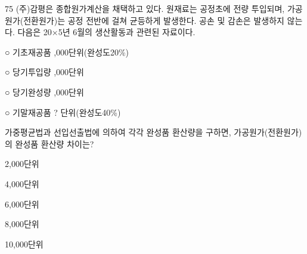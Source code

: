 \begin{question}{75}
(주)감평은 종합원가계산을 채택하고 있다. 원재료는 공정초에 전량 투입되며, 가공원가(전환원가)는 공정 전반에 걸쳐 균등하게 발생한다. 공손 및 감손은 발생하지 않는다. 다음은 20×5년 6월의 생산활동과 관련된 자료이다.
\begin{framedtext}
○ 기초재공품 ,000단위(완성도20\%) \par
○ 당기투입량 ,000단위 \par
○ 당기완성량 ,000단위 \par
○ 기말재공품 \quad ? 단위(완성도40\%)
\end{framedtext}
가중평균법과 선입선출법에 의하여 각각 완성품 환산량을 구하면, 가공원가(전환원가)의 완성품 환산량 차이는?
\begin{choices}
  \item 2,000단위
  \item 4,000단위
  \item 6,000단위
  \item 8,000단위
  \item 10,000단위
\end{choices}
\end{question}

